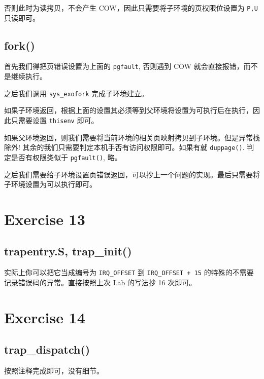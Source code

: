 \documentclass[11pt]{article}
\begin{document}
	\par 否则此时为读拷贝，不会产生 COW，因此只需要将子环境的页权限位设置为 \texttt{P,U} 只读即可。
	
	\subsection*{fork()}
	
	\par 首先我们得把页错误设置为上面的 \texttt{pgfault}, 否则遇到 COW 就会直接报错，而不是继续执行。
	
	\par 之后我们调用 \texttt{sys\_exofork} 完成子环境建立。
	
	\par 如果子环境返回，根据上面的设置其必须等到父环境将设置为可执行后在执行，因此只需要设置 \texttt{thisenv} 即可。
	
	\par 如果父环境返回，则我们需要将当前环境的相关页映射拷贝到子环境。但是异常栈除外! 其余的我们只需要判定本机手否有访问权限即可。如果有就 \texttt{duppage()}. 判定是否有权限类似于 \texttt{pgfault()}, 略。
	
	\par 之后我们需要给子环境设置页错误返回，可以抄上一个问题的实现。最后只需要将子环境设置为可以执行即可。
	
	\section{Exercise 13}
	
	\subsection*{trapentry.S, trap\_init()}
	
	\par 实际上你可以把它当成编号为 \texttt{IRQ\_OFFSET} 到 \texttt{IRQ\_OFFSET + 15} 的特殊的不需要记录错误码的异常。直接按照上次 Lab 的写法抄 16 次即可。
	
	
	\section{Exercise 14}
	
	\subsection*{trap\_dispatch()}
	
	\par 按照注释完成即可，没有细节。
	
\end{document}
